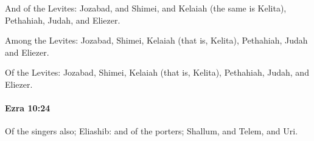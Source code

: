 			\begin{versebox}
					\item[BHS] 
					\item[LXX] 
					\item[ASV] And of the Levites: Jozabad, and Shimei, and Kelaiah (the same is Kelita), Pethahiah, Judah, and Eliezer.
					\item[NIV] Among the Levites: Jozabad, Shimei, Kelaiah (that is, Kelita), Pethahiah, Judah and Eliezer.
					\item[NRSV] Of the Levites: Jozabad, Shimei, Kelaiah (that is, Kelita), Pethahiah, Judah, and Eliezer.
			\end{versebox}

		\paragraph{Ezra 10:24} %
			\label{EZRA-10-24}

			Of the singers also; Eliashib: and of the porters; Shallum, and Telem, and Uri.

